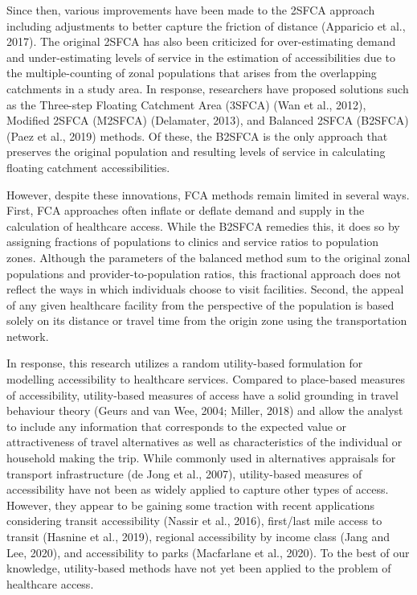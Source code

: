 \documentclass[]{elsarticle} %
\begin{document}
Since then, various improvements have been made to the 2SFCA approach
including adjustments to better capture the friction of distance
(Apparicio et al., 2017). The original 2SFCA has also been criticized
for over-estimating demand and under-estimating levels of service in the
estimation of accessibilities due to the multiple-counting of zonal
populations that arises from the overlapping catchments in a study area.
In response, researchers have proposed solutions such as the Three-step
Floating Catchment Area (3SFCA) (Wan et al., 2012), Modified 2SFCA
(M2SFCA) (Delamater, 2013), and Balanced 2SFCA (B2SFCA) (Paez et al.,
2019) methods. Of these, the B2SFCA is the only approach that preserves
the original population and resulting levels of service in calculating
floating catchment accessibilities.

However, despite these innovations, FCA methods remain limited in
several ways. First, FCA approaches often inflate or deflate demand and
supply in the calculation of healthcare access. While the B2SFCA
remedies this, it does so by assigning fractions of populations to
clinics and service ratios to population zones. Although the parameters
of the balanced method sum to the original zonal populations and
provider-to-population ratios, this fractional approach does not reflect
the ways in which individuals choose to visit facilities. Second, the
appeal of any given healthcare facility from the perspective of the
population is based solely on its distance or travel time from the
origin zone using the transportation network.

In response, this research utilizes a random utility-based formulation
for modelling accessibility to healthcare services. Compared to
place-based measures of accessibility, utility-based measures of access
have a solid grounding in travel behaviour theory (Geurs and van Wee,
2004; Miller, 2018) and allow the analyst to include any information
that corresponds to the expected value or attractiveness of travel
alternatives as well as characteristics of the individual or household
making the trip. While commonly used in alternatives appraisals for
transport infrastructure (de Jong et al., 2007), utility-based measures
of accessibility have not been as widely applied to capture other types
of access. However, they appear to be gaining some traction with recent
applications considering transit accessibility (Nassir et al., 2016),
first/last mile access to transit (Hasnine et al., 2019), regional
accessibility by income class (Jang and Lee, 2020), and accessibility to
parks (Macfarlane et al., 2020). To the best of our knowledge,
utility-based methods have not yet been applied to the problem of
healthcare access.
\end{document}
